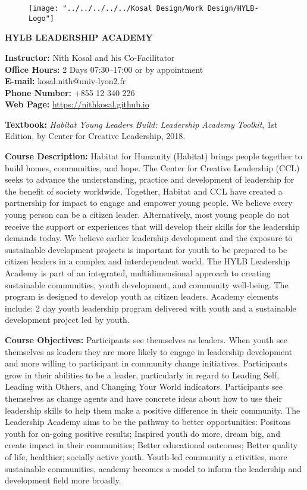 \documentclass[11pt,a4paper]{article}
\begin{document}
	\begin{figure}
		\centering
		\texttt{[image: "../../../../../Kosal Design/Work Design/HYLB-Logo"]}
	\end{figure}
	
	
	\begin{center}
		\large \textbf{HYLB LEADERSHIP ACADEMY}
	\end{center}
\textbf{Instructor:} Nith Kosal and his Co-Facilitator \\
\textbf{Office Hours:} 2 Days 07:30--17:00 or by appointment \\
\textbf{E-mail:} kosal.nith@univ-lyon2.fr \\
\textbf{Phone Number:} +855 12 340 226 \\
\textbf{Web Page:} \url{https://nithkosal.github.io}

\textbf{Textbook:} \textit{Habitat Young Leaders Build: Leadership Academy Toolkit}, 1st Edition, by Center for Creative Leadership, 2018. 

\textbf{Course Description:} Habitat for Humanity (Habitat) brings people together to build homes, communities, and hope. The Center for Creative Leadership (CCL) seeks to advance the understanding, practice and development of leadership for the benefit of society worldwide. Together, Habitat and CCL have created a partnership for impact to engage and empower young people. We believe every young person can be a citizen leader. Alternatively, most young people do not receive the support or experiences that will develop their skills for the leadership demands today. We believe earlier leadership development and the exposure to sustainable development projects is important for youth to be prepared to be citizen leaders in a complex and interdependent world.
The HYLB Leadership Academy is part of an integrated, multidimensional approach to creating sustainable communities, youth development, and community well-being. The program is designed to develop youth as citizen leaders. Academy elements include: 2 day youth leadership program delivered with youth and a sustainable development project led by youth.  

\textbf{Course Objectives:} Participants see themselves as leaders. When youth see themselves as leaders they are more likely to engage in leadership development and more willing to participant in community change initiatives. Participants grow in their abilities to be a leader, particularly in regard to Leading Self, Leading with Others, and Changing Your World indicators. Participants see themselves as change agents and have concrete ideas about how to use their leadership skills to help them make a positive difference in their community. The Leadership Academy aims to be the pathway to better opportunities: Positons youth for on-going positive results; Inspired youth do more, dream big, and create impact in their communities; Better educational outcomes; Better quality of life, healthier; socially active youth. Youth-led community a ctivities, more sustainable communities, academy becomes a model to inform the leadership and development field more broadly.
\end{document}

